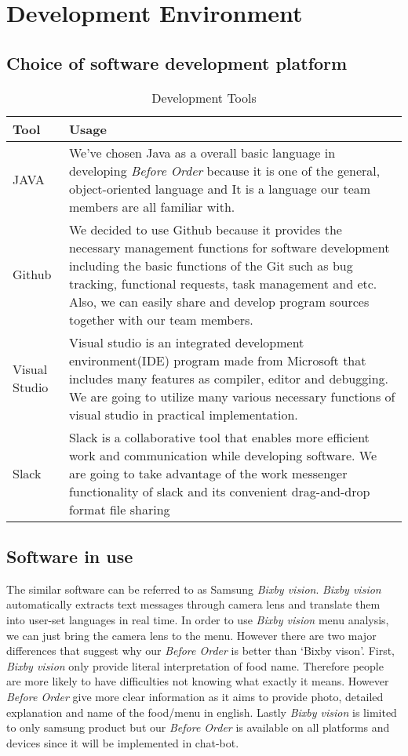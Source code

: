 \section{Development Environment}
\subsection{Choice of software development platform}
\begin{table}[htb]
\caption{Development Tools}
\begin{tabularx}{\linewidth}{|X|X|}
\toprule
Tool & Usage \\
\midrule
JAVA & We’ve chosen Java as a overall basic language in developing \emph{Before Order} because it is one of the general, object-oriented language and It is a language our team members are all familiar with.\\
Github	& We decided to use Github because it provides the necessary management functions for software development including the basic functions of the Git such as bug tracking, functional requests, task management and etc. Also, we can easily share and develop program sources together with our team members.\\
Visual Studio & Visual studio is an integrated development environment(IDE) program made from Microsoft that includes many features as compiler, editor and debugging. We are going to utilize many various necessary functions of visual studio in practical implementation.\\
Slack & Slack is a collaborative tool that enables more efficient work and communication while developing software. We are going to take advantage of the work messenger functionality of slack and its convenient drag-and-drop format file sharing
\end{tabularx}
\end{table}
\FloatBarrier

\subsection{Software in use}
The similar software can be referred to as Samsung \emph{Bixby vision}. \emph{Bixby vision} automatically extracts text messages through camera lens and translate them into user-set languages in real time. In order to use \emph{Bixby vision} menu analysis, we can just bring the camera lens to the menu. However there are two major differences that suggest why our \emph{Before Order} is better than ‘Bixby vison’. First, \emph{Bixby vision} only provide literal interpretation of food name. Therefore people are more likely to have difficulties not knowing what exactly it means. However \emph{Before Order} give more clear information as it aims to provide photo, detailed explanation and name of the food/menu in english. Lastly \emph{Bixby vision} is limited to only samsung product but our \emph{Before Order} is available on all platforms and devices since it will be implemented in chat-bot.

